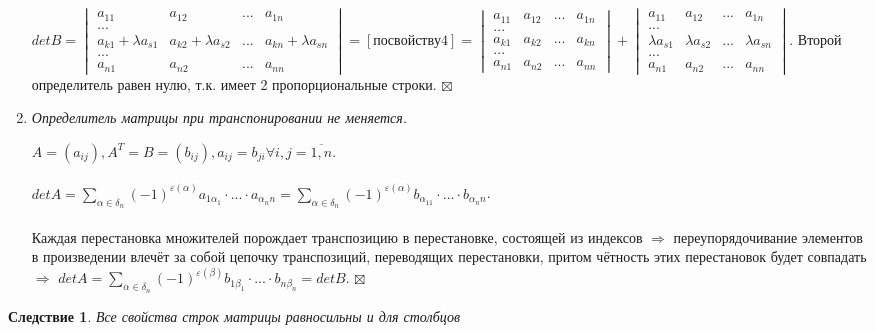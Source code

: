 \documentclass[a4paper, 12pt]{report}
\newenvironment{Proof} %
{\par\noindent{$\blacklozenge$}} %
{\hfill$\scriptstyle\boxtimes$}
\begin{document}
\begin{enumerate}
\begin{Proof}
			$det B =  \begin{vmatrix}
				a_{11}& a_{12} & ... & a_{1n}\\
				... \\
				a_{k1} + \lambda a_{s1} & a_{k2} + \lambda a_{s2} & ... &a_{kn} + \lambda a_{sn}\\
				... \\
				a_{n1} & a_{n2} & ... & a_{nn}
			\end{vmatrix} = [по свойству 4] =  \begin{vmatrix}
				a_{11}& a_{12} & ... & a_{1n}\\
				... \\
				a_{k1} & a_{k2} & ... &a_{kn} \\
				... \\
				a_{n1} & a_{n2} & ... & a_{nn}
			\end{vmatrix} + \begin{vmatrix}
				a_{11}& a_{12} & ... & a_{1n}\\
				... \\
				\lambda a_{s1} & \lambda a_{s2} & ... &\lambda a_{sn}\\
				... \\
				a_{n1} & a_{n2} & ... & a_{nn}
			\end{vmatrix}.$ Второй определитель равен нулю, т.к. имеет 2 пропорциональные строки.
		\end{Proof}
		
		\item \textit{Определитель матрицы при транспонировании не меняется.}
		\begin{Proof} $A = (a_{ij}), A^T = B = (b_{ij}), a_{ij} = b_{ji} \forall i, j = \overline{1, n}$.\\\\
			$det A = \sum\limits_{\alpha \in \delta_n} (-1)^{\varepsilon(\alpha)}a_{1\alpha_1} \cdot ... \cdot a_{\alpha_nn} = \sum\limits_{\alpha \in \delta_n} (-1)^{\varepsilon(\alpha)}b_{\alpha_11} \cdot ...  \cdot b_{\alpha_nn}$.\\\\
			Каждая перестановка множителей порождает транспозицию в перестановке, состоящей из индексов $\Rightarrow$ переупорядочивание элементов в произведении влечёт за собой цепочку транспозиций, переводящих перестановки, притом чётность этих перестановок будет совпадать $\Rightarrow$ $det A = \sum\limits_{\alpha \in \delta_n} (-1)^{\varepsilon(\beta)}b_{1\beta_1} \cdot ...  \cdot b_{n\beta_n} = det B$. \end{Proof}
	\end{enumerate}
	\newtheorem*{cor41_4}{Следствие}\begin{cor41_4}
		Все свойства строк матрицы равносильны и для столбцов
	\end{cor41_4}
	
\end{document}
